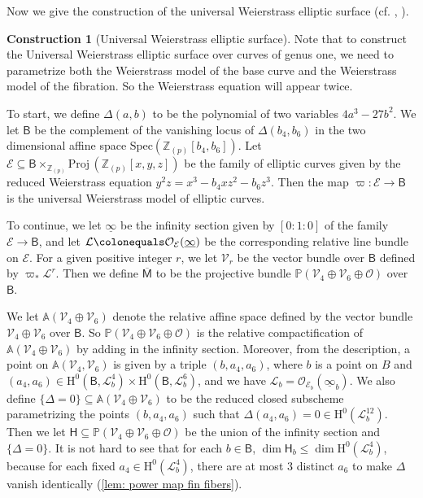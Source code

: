 \documentclass[11pt, letterpaper]{amsart}
\theoremstyle{plain}
\theoremstyle{definition}
\newtheorem{construction}[theorem]{Construction}
\newcommand{\IA}{\mathbb{A}}
\newcommand{\IP}{\mathbb{P}}
\newcommand{\IZ}{\mathbb{Z}}
\newcommand{\Spec}{\mathrm{Spec}}
\newcommand{\<}{\langle}
\renewcommand{\>}{\rangle}
\newcommand{\sV}{\mathcal{V}}
\newcommand{\Proj}{\mathrm{Proj\,}}
\newcommand{\sE}{\mathcal{E}}
\newcommand{\sL}{\mathcal{L}}
\newcommand{\sO}{\mathcal{O}}
\newcommand{\sfM}{\mathsf{M}}
\renewcommand{\H}{\mathrm{H}}
\newcommand{\sfH}{\mathsf{H}}
\newcommand{\sfB}{\mathsf{B}}
\begin{document}
Now we give the construction of the universal Weierstrass elliptic surface (cf. \cite{Kas}, \cite[\S7.1]{HYZ}).
\begin{construction}[Universal Weierstrass elliptic surface]
\label{const: Weierstrass}
Note that to construct the Universal Weierstrass elliptic surface over curves of genus one, we need to parametrize both the Weierstrass model of the base curve and the Weierstrass model of the fibration.
So the Weierstrass equation will appear twice.



    To start, we define $\Delta(a, b)$ to be the polynomial of two variables $4a^3 - 27b^2$.
    We let $\sfB$ be the complement of the vanishing locus of $\Delta(b_4, b_6)$ in the two dimensional affine space $\Spec(\IZ_{(p)}[b_4, b_6])$. 
    Let $\sE \subseteq \sfB \times_{\IZ_{(p)}} \Proj (\IZ_{(p)}[x, y, z])$ be the family of elliptic curves given by the reduced Weierstrass equation $y^2 z=x^3 - b_4 x z^2 - b_6 z^3$. 
    Then the map $\varpi\colon \sE\to \sfB$ is the universal Weierstrass model of elliptic curves.
    
    To continue, we let $\underline{\infty}$ be the infinity section given by $[0 : 1 : 0]$ of the family $\sE\to \sfB$, and let $\sL \colonequals \sO_\sE(\underline{\infty})$ be the corresponding relative line bundle on $\sE$.  
    For a given positive integer $r$, we let $\sV_r$ be the vector bundle over $\sfB$ defined by $\varpi_* \sL^r$. 
    Then we define $\overline{\sfM}$ to be the projective bundle $\IP(\sV_4 \oplus \sV_6 \oplus \sO)$ over $\sfB$. 
    
    We let $\IA(\sV_4 \oplus \sV_6)$ denote the relative affine space defined by the vector bundle $\sV_4 \oplus \sV_6$ over $\sfB$.
    So $\IP(\sV_4 \oplus \sV_6 \oplus \sO)$ is the relative compactification of $\IA(\sV_4 \oplus \sV_6)$ by adding in the infinity section. 
    Moreover, from the description, a point on $\IA(\sV_4, \sV_6)$ is given by a triple $(b, a_4, a_6)$, where $b$ is a point on $B$ and $(a_4, a_6) \in \H^0(\sfB, \sL_b^4) \times \H^0(\sfB, \sL_b^6)$, and we have $\sL_b = \sO_{\sE_b}(\underline{\infty}_b)$.
    We also define $\{ \Delta = 0 \} \subseteq \IA(\sV_4 \oplus \sV_6)$ to be the reduced closed subscheme parametrizing the points $(b, a_4, a_6)$ such that $\Delta(a_4, a_6) = 0 \in \H^0(\sL_b^{12})$.
    Then we let $\sfH \subseteq \IP(\sV_4 \oplus \sV_6 \oplus \sO)$ be the union of the infinity section and $\{ \Delta = 0 \}$. 
    It is not hard to see that for each $b \in \sfB$, $\dim \sfH_b \le \dim \H^0(\sL_b^4)$, because for each fixed $a_4 \in \H^0(\sL_b^4)$, there are at most $3$ distinct $a_6$ to make $\Delta$ vanish identically (\cref{lem: power map fin fibers}).
    

\end{construction}
\end{document}
